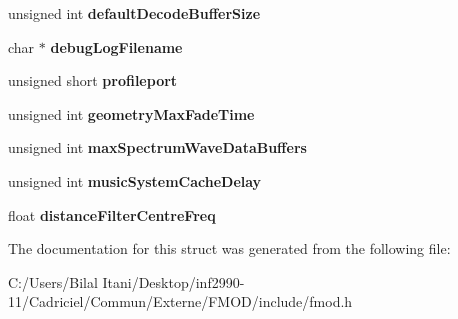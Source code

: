 \begin{DoxyCompactItemize}
\item 
unsigned int {\bfseries default\+Decode\+Buffer\+Size}\hypertarget{struct_f_m_o_d___a_d_v_a_n_c_e_d_s_e_t_t_i_n_g_s_a8b2d2802cd34875f10d319c8f363e399}{}\label{struct_f_m_o_d___a_d_v_a_n_c_e_d_s_e_t_t_i_n_g_s_a8b2d2802cd34875f10d319c8f363e399}

\item 
char $\ast$ {\bfseries debug\+Log\+Filename}\hypertarget{struct_f_m_o_d___a_d_v_a_n_c_e_d_s_e_t_t_i_n_g_s_a00d10a918d3414c8f4bde3664f01b44f}{}\label{struct_f_m_o_d___a_d_v_a_n_c_e_d_s_e_t_t_i_n_g_s_a00d10a918d3414c8f4bde3664f01b44f}

\item 
unsigned short {\bfseries profileport}\hypertarget{struct_f_m_o_d___a_d_v_a_n_c_e_d_s_e_t_t_i_n_g_s_a5d12c84c6911facd30fcba7ab0dd7faa}{}\label{struct_f_m_o_d___a_d_v_a_n_c_e_d_s_e_t_t_i_n_g_s_a5d12c84c6911facd30fcba7ab0dd7faa}

\item 
unsigned int {\bfseries geometry\+Max\+Fade\+Time}\hypertarget{struct_f_m_o_d___a_d_v_a_n_c_e_d_s_e_t_t_i_n_g_s_a973568fb1ec638193a0b0198d4165558}{}\label{struct_f_m_o_d___a_d_v_a_n_c_e_d_s_e_t_t_i_n_g_s_a973568fb1ec638193a0b0198d4165558}

\item 
unsigned int {\bfseries max\+Spectrum\+Wave\+Data\+Buffers}\hypertarget{struct_f_m_o_d___a_d_v_a_n_c_e_d_s_e_t_t_i_n_g_s_a0404a31fe61b9d4e2340125a2a38a00d}{}\label{struct_f_m_o_d___a_d_v_a_n_c_e_d_s_e_t_t_i_n_g_s_a0404a31fe61b9d4e2340125a2a38a00d}

\item 
unsigned int {\bfseries music\+System\+Cache\+Delay}\hypertarget{struct_f_m_o_d___a_d_v_a_n_c_e_d_s_e_t_t_i_n_g_s_abb66bb0cce280bd12f4092d2b3f642d1}{}\label{struct_f_m_o_d___a_d_v_a_n_c_e_d_s_e_t_t_i_n_g_s_abb66bb0cce280bd12f4092d2b3f642d1}

\item 
float {\bfseries distance\+Filter\+Centre\+Freq}\hypertarget{struct_f_m_o_d___a_d_v_a_n_c_e_d_s_e_t_t_i_n_g_s_aec899d9cc69d0d664393d48f87dd9373}{}\label{struct_f_m_o_d___a_d_v_a_n_c_e_d_s_e_t_t_i_n_g_s_aec899d9cc69d0d664393d48f87dd9373}

\end{DoxyCompactItemize}


The documentation for this struct was generated from the following file\+:\begin{DoxyCompactItemize}
\item 
C\+:/\+Users/\+Bilal Itani/\+Desktop/inf2990-\/11/\+Cadriciel/\+Commun/\+Externe/\+F\+M\+O\+D/include/fmod.\+h\end{DoxyCompactItemize}
